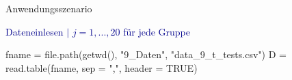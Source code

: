 \documentclass[
  8pt,
  ignorenonframetext,
]{beamer}
\newenvironment{Shaded}{\begin{snugshade}}{\end{snugshade}}
\newcommand{\AttributeTok}[1]{\textcolor[rgb]{0.77,0.63,0.00}{#1}}
\newcommand{\ConstantTok}[1]{\textcolor[rgb]{0.00,0.00,0.00}{#1}}
\newcommand{\FunctionTok}[1]{\textcolor[rgb]{0.00,0.00,0.00}{#1}}
\newcommand{\NormalTok}[1]{#1}
\newcommand{\OtherTok}[1]{\textcolor[rgb]{0.56,0.35,0.01}{#1}}
\newcommand{\StringTok}[1]{\textcolor[rgb]{0.31,0.60,0.02}{#1}}
\begin{document}
\begin{frame}[fragile]{Anwendungsszenario}
\protect\hypertarget{anwendungsszenario-8}{}
\vspace{3mm}
\small

\textcolor{darkblue}{Dateneinlesen $\vert$ $j = 1,...,20$ für jede Gruppe}
 \tiny \vspace{1mm}

\begin{Shaded}
\begin{Highlighting}[]
\NormalTok{fname       }\OtherTok{=} \FunctionTok{file.path}\NormalTok{(}\FunctionTok{getwd}\NormalTok{(), }\StringTok{"9\_Daten"}\NormalTok{, }\StringTok{"data\_9\_t\_tests.csv"}\NormalTok{)}
\NormalTok{D           }\OtherTok{=} \FunctionTok{read.table}\NormalTok{(fname, }\AttributeTok{sep =} \StringTok{","}\NormalTok{, }\AttributeTok{header =} \ConstantTok{TRUE}\NormalTok{)}
\end{Highlighting}
\end{Shaded}

\vspace{-1mm}


\end{frame}
\end{document}
